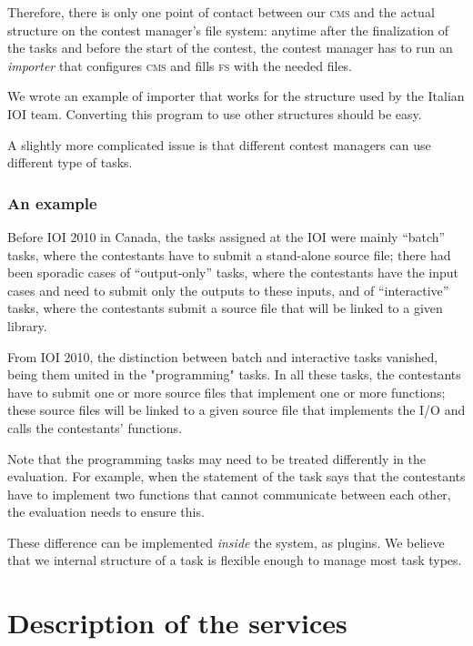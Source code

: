 \documentclass[a4paper,8pt]{amsart}
\newcommand{\CMS}{\textsc{cms}}
\newcommand{\FS}{\textsc{fs}}
\begin{document}
\begin{multicols}{2}
  Therefore, there is only one point of contact between our \CMS{} and
  the actual structure on the contest manager's file system: anytime
  after the finalization of the tasks and before the start of the
  contest, the contest manager has to run an \emph{importer\/} that
  configures \CMS{} and fills \FS{} with the needed files.

  We wrote an example of importer that works for the structure used by
  the Italian IOI team. Converting this program to use other
  structures should be easy.

  A slightly more complicated issue is that different contest managers
  can use different type of tasks.

  \subsubsection{An example}

  Before IOI 2010 in Canada, the tasks assigned at the IOI were mainly
  ``batch'' tasks, where the contestants have to submit a stand-alone
  source file; there had been sporadic cases of ``output-only'' tasks,
  where the contestants have the input cases and need to submit only
  the outputs to these inputs, and of ``interactive'' tasks, where the
  contestants submit a source file that will be linked to a given
  library.

  From IOI 2010, the distinction between batch and interactive tasks
  vanished, being them united in the "programming" tasks. In all these
  tasks, the contestants have to submit one or more source files that
  implement one or more functions; these source files will be linked
  to a given source file that implements the I/O and calls the
  contestants' functions.

  Note that the programming tasks may need to be treated differently
  in the evaluation. For example, when the statement of the task says
  that the contestants have to implement two functions that cannot
  communicate between each other, the evaluation needs to ensure this.

  These difference can be implemented \emph{inside} the system, as
  plugins. We believe that we internal structure of a task is flexible
  enough to manage most task types.

  \section{Description of the services}


\end{multicols}
\end{document}
